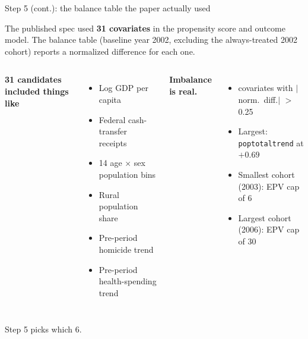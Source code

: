 \documentclass[aspectratio=169,12pt,t]{beamer}
\begin{document}
\begin{frame}{Step 5 (cont.): the balance table the paper actually used}
\vspace{0.25cm}

The published spec used \textbf{31 covariates} in the propensity score and outcome model. \;The balance table (baseline year 2002, excluding the always-treated 2002 cohort) reports a normalized difference for each one.

\vspace{0.35cm}

\begin{columns}[T,onlytextwidth]
\textbf{31 candidates included things like}
\begin{itemize}\scriptsize\setlength\itemsep{0pt}
  \item Log GDP per capita
  \item Federal cash-transfer receipts
  \item 14 age $\times$ sex population bins
  \item Rural population share
  \item Pre-period homicide trend
  \item Pre-period health-spending trend
\end{itemize}

\textbf{Imbalance is real.}
\begin{itemize}\scriptsize\setlength\itemsep{0pt}
  \item {} covariates with $|$norm.\ diff.$|$ $>$ 0.25
  \item Largest: \;\texttt{poptotaltrend} \;at \;$+0.69$
  \item Smallest cohort (2003): EPV cap of 6
  \item Largest cohort (2006): EPV cap of 30
\end{itemize}
\end{columns}

\vspace{0.25cm}
 \;Step 5 picks which 6.
\end{frame}

\end{document}
